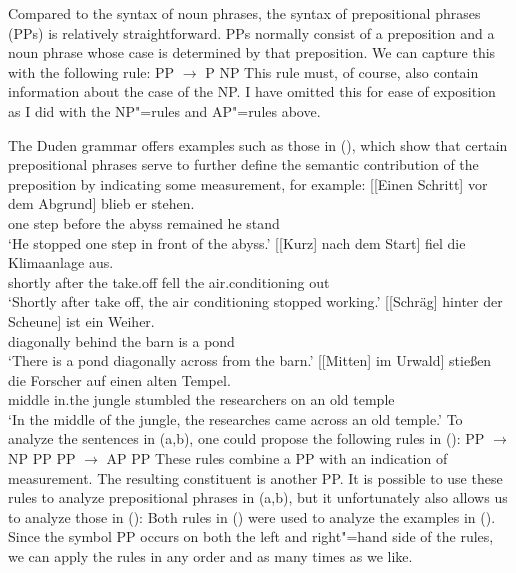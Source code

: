 Compared to the syntax of noun phrases, the syntax of prepositional phrases (PPs) is relatively straightforward. PPs normally 
consist of a preposition and a noun phrase whose case is determined by that preposition. We can capture this with the following
rule:
\ea
\label{Regel-PP-einfach}
PP $\to$ P NP
\z
This rule must, of course, also contain information about the case of the NP. I have omitted this for ease of exposition as I did
with the NP"=rules and AP"=rules above.

The Duden grammar \citep[\S 1300]{Duden2005-Authors} offers examples such as those in (), which show that certain prepositional phrases
serve to further define the semantic contribution of the preposition by indicating some measurement, for example:
\eal
\ex\label{Beispiel-Schritt-vor-dem-Abgrund} 
\gll {}[[Einen Schritt] vor dem Abgrund] blieb er stehen.\\
	 {}\spacebr{}\spacebr{}one step before the abyss remained he stand\\
\glt `He stopped one step in front of the abyss.'
\ex 
\gll {}[[Kurz] nach dem Start] fiel die Klimaanlage aus.\\
	 {}\spacebr{}\spacebr{}shortly after the take.off fell the air.conditioning out\\
\glt `Shortly after take off, the air conditioning stopped working.'
\ex 
\gll {}[[Schräg] hinter der Scheune] ist ein Weiher.\\
	 {}\spacebr{}\spacebr{}diagonally behind the barn is a pond\\
\glt `There is a pond diagonally across from the barn.'
\ex 
\gll {}[[Mitten] im Urwald] stießen die Forscher auf einen alten Tempel.\\
	 {}\spacebr{}\spacebr{}middle in.the jungle stumbled the researchers on an old temple\\
\glt `In the middle of the jungle, the researches came across an old temple.'
\zl
To analyze the sentences in (a,b), one could propose the following rules in ():
\eal
\ex PP $\to$ NP PP
\ex PP $\to$ AP PP
\zl
These rules combine a PP with an indication of measurement. The resulting constituent is another PP. It is
possible to use these rules to analyze prepositional phrases in (a,b), but it unfortunately also allows
us to analyze those in ():
\eal
{}
\zl
Both rules in () were used to analyze the examples in (). Since the symbol PP occurs on both the left 
and right"=hand side of the rules, we can apply the rules in any order and as many times as we like.

